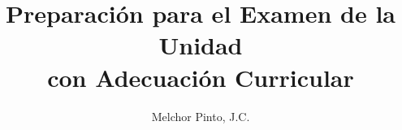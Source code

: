 \documentclass[12pt,addpoints]{repaso}
\title{Preparación para el Examen de la Unidad\\con Adecuación Curricular}
\author{Melchor Pinto, J.C.}
\begin{document}
\INFO%
\begin{multicols}{2}%
    
    
    
\end{multicols}%
\begin{questions}
    \questionboxed[15]{}
    \ejemplosboxed[]
    \questionboxed[20]{}
    \ejemplosboxed[]
    \questionboxed[5]{}
    \questionboxed[5]{}
    \questionboxed[5]{}
    \ejemplosboxed[]
    \questionboxed[10]{}
    \questionboxed[10]{}
    \questionboxed[10]{}
    \ejemplosboxed[]
    \questionboxed[5]{}
    \questionboxed[5]{}
    \questionboxed[5]{}
    \questionboxed[5]{}
\end{questions}
\end{document}
